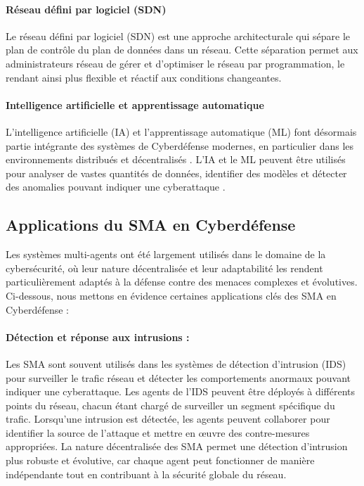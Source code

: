 \paragraph{Réseau défini par logiciel (SDN)}

Le réseau défini par logiciel (SDN) est une approche architecturale qui sépare le plan de contrôle du plan de données dans un réseau. Cette séparation permet aux administrateurs réseau de gérer et d'optimiser le réseau par programmation, le rendant ainsi plus flexible et réactif aux conditions changeantes. \cite{Kreutz2015}

\paragraph{Intelligence artificielle et apprentissage automatique}

L'intelligence artificielle (IA) et l'apprentissage automatique (ML) font désormais partie intégrante des systèmes de Cyberdéfense modernes, en particulier dans les environnements distribués et décentralisés \cite{Buczak2016}. L'IA et le ML peuvent être utilisés pour analyser de vastes quantités de données, identifier des modèles et détecter des anomalies pouvant indiquer une cyberattaque \cite{Vinayakumar2019}.


\subsection{Applications du SMA en Cyberdéfense}

Les systèmes multi-agents ont été largement utilisés dans le domaine de la cybersécurité, où leur nature décentralisée et leur adaptabilité les rendent particulièrement adaptés à la défense contre des menaces complexes et évolutives. Ci-dessous, nous mettons en évidence certaines applications clés des SMA en Cyberdéfense :

\paragraph{Détection et réponse aux intrusions :}
Les SMA sont souvent utilisés dans les systèmes de détection d'intrusion (IDS) pour surveiller le trafic réseau et détecter les comportements anormaux pouvant indiquer une cyberattaque. Les agents de l'IDS peuvent être déployés à différents points du réseau, chacun étant chargé de surveiller un segment spécifique du trafic. Lorsqu'une intrusion est détectée, les agents peuvent collaborer pour identifier la source de l'attaque et mettre en œuvre des contre-mesures appropriées. La nature décentralisée des SMA permet une détection d'intrusion plus robuste et évolutive, car chaque agent peut fonctionner de manière indépendante tout en contribuant à la sécurité globale du réseau.

